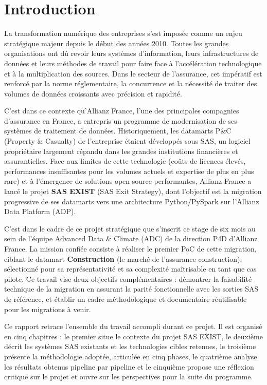 \chapter*{Introduction}

La transformation numérique des entreprises s'est imposée comme un enjeu stratégique majeur depuis le début des années 2010. Toutes les grandes organisations ont dû revoir leurs systèmes d'information, leurs infrastructures de données et leurs méthodes de travail pour faire face à l'accélération technologique et à la multiplication des sources. Dans le secteur de l'assurance, cet impératif est renforcé par la norme réglementaire, la concurrence et la nécessité de traiter des volumes de données croissants avec précision et rapidité.

C'est dans ce contexte qu'Allianz France, l'une des principales compagnies d'assurance en France, a entrepris un programme de modernisation de ses systèmes de traitement de données. Historiquement, les datamarts P\&C (Property \& Casualty) de l'entreprise étaient développés sous SAS, un logiciel propriétaire largement répandu dans les grandes institutions financières et assurantielles. Face aux limites de cette technologie (coûts de licences élevés, performances insuffisantes pour les volumes actuels et expertise de plus en plus rare) et à l'émergence de solutions open source performantes, Allianz France a lancé le projet \textbf{SAS EXIST} (SAS Exit Strategy), dont l'objectif est la migration progressive de ses datamarts vers une architecture Python/PySpark sur l'Allianz Data Platform (ADP).

C'est dans le cadre de ce projet stratégique que s'inscrit ce stage de six mois au sein de l'équipe Advanced Data \& Climate (ADC) de la direction P4D d'Allianz France. La mission confiée consiste à réaliser le premier PoC de cette migration, ciblant le datamart \textbf{Construction} (le marché de l'assurance construction), sélectionné pour sa représentativité et sa complexité maîtrisable en tant que cas pilote. Ce travail vise deux objectifs complémentaires : démontrer la faisabilité technique de la migration en assurant la parité fonctionnelle avec les sorties SAS de référence, et établir un cadre méthodologique et documentaire réutilisable pour les migrations à venir.

Ce rapport retrace l'ensemble du travail accompli durant ce projet. Il est organisé en cinq chapitres : le premier situe le contexte du projet SAS EXIST, le deuxième décrit les systèmes SAS existants et les technologies cibles retenues, le troisième présente la méthodologie adoptée, articulée en cinq phases, le quatrième analyse les résultats obtenus pipeline par pipeline et le cinquième propose une réflexion critique sur le projet et ouvre sur les perspectives pour la suite du programme.

\cleardoublepage
